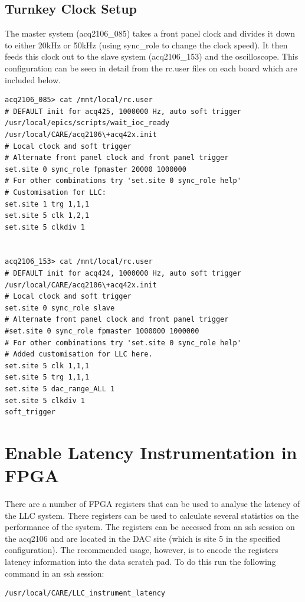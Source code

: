 \documentclass{article}
\begin{document}
\subsection{Turnkey Clock Setup}
The master system (acq2106\_085) takes a front panel clock and divides it down to either 20kHz or 50kHz (using sync\_role to change the clock speed).
It then feeds this clock out to the slave system (acq2106\_153) and the oscilloscope.
This configuration can be seen in detail from the rc.user files on each board which are included below.

\begin{verbatim}
acq2106_085> cat /mnt/local/rc.user
# DEFAULT init for acq425, 1000000 Hz, auto soft trigger
/usr/local/epics/scripts/wait_ioc_ready
/usr/local/CARE/acq2106\+acq42x.init
# Local clock and soft trigger
# Alternate front panel clock and front panel trigger
set.site 0 sync_role fpmaster 20000 1000000
# For other combinations try 'set.site 0 sync_role help'
# Customisation for LLC:
set.site 1 trg 1,1,1
set.site 5 clk 1,2,1
set.site 5 clkdiv 1


acq2106_153> cat /mnt/local/rc.user
# DEFAULT init for acq424, 1000000 Hz, auto soft trigger
/usr/local/CARE/acq2106\+acq42x.init
# Local clock and soft trigger
set.site 0 sync_role slave
# Alternate front panel clock and front panel trigger
#set.site 0 sync_role fpmaster 1000000 1000000
# For other combinations try 'set.site 0 sync_role help'
# Added customisation for LLC here.
set.site 5 clk 1,1,1
set.site 5 trg 1,1,1
set.site 5 dac_range_ALL 1
set.site 5 clkdiv 1
soft_trigger
\end{verbatim}

\section{Enable Latency Instrumentation in FPGA} \label{latency_intrumentation}
There are a number of FPGA registers that can be used to analyse the latency of the LLC system.
There registers can be used to calculate several statistics on the performance of the system.
The registers can be accessed from an ssh session on the acq2106 and are located in the DAC site (which is site 5 in the specified configuration).
The recommended usage, however, is to encode the registers latency information into the data scratch pad.
To do this run the following command in an ssh session:

\begin{verbatim}/usr/local/CARE/LLC_instrument_latency\end{verbatim}
\end{document}
